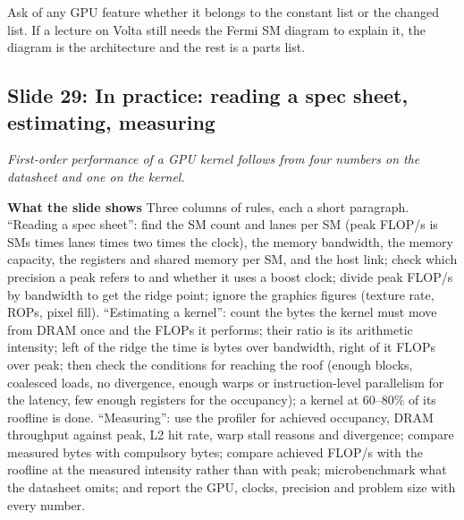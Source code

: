 \documentclass[11pt,letterpaper]{article}
\newcommand{\slide}[3]{%
  \subsection[Slide #1: #2]{Slide #1: #2}%
  {\color{muted}\itshape #3\par}\medskip}
\newcommand{\para}[1]{\medskip\noindent\textbf{#1}\quad}
\newenvironment{intuition}{\begin{tcolorbox}[intuitionbox]}{\end{tcolorbox}}
\begin{document}
\begin{intuition}
Ask of any GPU feature whether it belongs to the constant list or the changed list. If a lecture on Volta still needs the Fermi SM diagram to explain it, the diagram is the architecture and the rest is a parts list.
\end{intuition}

\slide{29}{In practice: reading a spec sheet, estimating, measuring}{First-order performance of a GPU kernel follows from four numbers on the datasheet and one on the kernel.}

\para{What the slide shows} Three columns of rules, each a short paragraph. ``Reading a spec sheet'': find the SM count and lanes per SM (peak FLOP/s is SMs times lanes times two times the clock), the memory bandwidth, the memory capacity, the registers and shared memory per SM, and the host link; check which precision a peak refers to and whether it uses a boost clock; divide peak FLOP/s by bandwidth to get the ridge point; ignore the graphics figures (texture rate, ROPs, pixel fill). ``Estimating a kernel'': count the bytes the kernel must move from DRAM once and the FLOPs it performs; their ratio is its arithmetic intensity; left of the ridge the time is bytes over bandwidth, right of it FLOPs over peak; then check the conditions for reaching the roof (enough blocks, coalesced loads, no divergence, enough warps or instruction-level parallelism for the latency, few enough registers for the occupancy); a kernel at 60--80\% of its roofline is done. ``Measuring'': use the profiler for achieved occupancy, DRAM throughput against peak, L2 hit rate, warp stall reasons and divergence; compare measured bytes with compulsory bytes; compare achieved FLOP/s with the roofline at the measured intensity rather than with peak; microbenchmark what the datasheet omits; and report the GPU, clocks, precision and problem size with every number.
\end{document}
